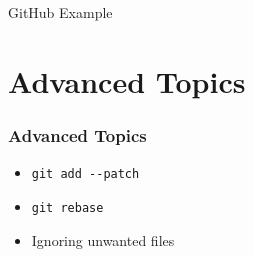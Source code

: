 \documentclass{beamer}
\begin{document}
\begin{frame}[plain]
 \vfill
 \begin{center}
  \LARGE \color{solarizedAccent} GitHub Example
 \end{center}
 \vfill
\end{frame}

\appendix

\section{Advanced Topics}

\begin{frame}
 \frametitle{Advanced Topics}

 \begin{itemize}[<+->]
  \item \texttt{git add \alert{-{}-patch}}
  \item \texttt{git rebase}
  \item Ignoring unwanted files
 \end{itemize}
\end{frame}
\end{document}
